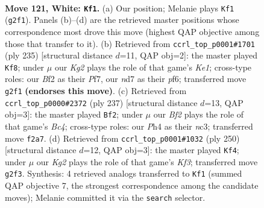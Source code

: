 \documentclass[11pt]{article}
\begin{document}
\clearpage

\begin{figure}[p]\centering
\begin{subfigure}{0.46\textwidth}\centering
\resizebox{\linewidth}{!}{%
\newchessgame
\chessboard[
  setfen={7k/3n4/8/5P2/p6P/P7/5BK1/8 w - - 9 121},
  showmover=false,
  pgfstyle=straightmove, color=movearrow, markmove={g2-f1}
]}
\caption{}
\end{subfigure}\hfill
\begin{subfigure}{0.46\textwidth}\centering
\resizebox{\linewidth}{!}{%
\newchessgame
\chessboard[
  setfen={4k3/5p1p/5P1P/8/2K5/5p2/5B2/8 b - - 65 118},
  showmover=false,
  pgfstyle=straightmove, color=movearrow, markmove={e8-f8}
]}
\caption{}
\end{subfigure}
\\[4pt]
\begin{subfigure}{0.46\textwidth}\centering
\resizebox{\linewidth}{!}{%
\newchessgame
\chessboard[
  setfen={8/8/2k5/2b1K3/8/p1N5/P7/8 b - - 95 119},
  showmover=false,
  pgfstyle=straightmove, color=movearrow, markmove={c5-f2}
]}
\caption{}
\end{subfigure}\hfill
\begin{subfigure}{0.46\textwidth}\centering
\resizebox{\linewidth}{!}{%
\newchessgame
\chessboard[
  setfen={8/6k1/5p2/1n3P2/7P/4BK2/8/8 w - - 55 126},
  showmover=false,
  pgfstyle=straightmove, color=movearrow, markmove={f3-f4}
]}
\caption{}
\end{subfigure}
\caption{\textbf{Move 121, White: \texttt{Kf1}.} (a) Our position; Melanie plays \texttt{Kf1} (\texttt{g2f1}). Panels (b)--(d) are the retrieved master positions whose correspondence most drove this move (highest QAP objective among those that transfer to it). (b) Retrieved from \texttt{ccrl\_top\_p0001\#1701} (ply 235) [structural distance $d$=11, QAP obj=2]: the master played \texttt{Kf8}; under $\mu$ our \emph{Kg2} plays the role of that game's \emph{Ke1}; cross-type roles: our \emph{B}f2 as their \emph{P}f7, our \emph{n}d7 as their \emph{p}f6; transferred move \texttt{g2f1} \textbf{(endorses this move)}. (c) Retrieved from \texttt{ccrl\_top\_p0000\#2372} (ply 237) [structural distance $d$=13, QAP obj=3]: the master played \texttt{Bf2}; under $\mu$ our \emph{Bf2} plays the role of that game's \emph{Bc4}; cross-type roles: our \emph{P}h4 as their \emph{n}c3; transferred move \texttt{f2a7}. (d) Retrieved from \texttt{ccrl\_top\_p0001\#1032} (ply 250) [structural distance $d$=12, QAP obj=3]: the master played \texttt{Kf4}; under $\mu$ our \emph{Kg2} plays the role of that game's \emph{Kf3}; transferred move \texttt{g2f3}. Synthesis: 4 retrieved analogs transferred to \texttt{Kf1} (summed QAP objective 7, the strongest correspondence among the candidate moves); Melanie committed it via the \texttt{search} selector.}
\label{fig:thought-m240}
\end{figure}
\end{document}
